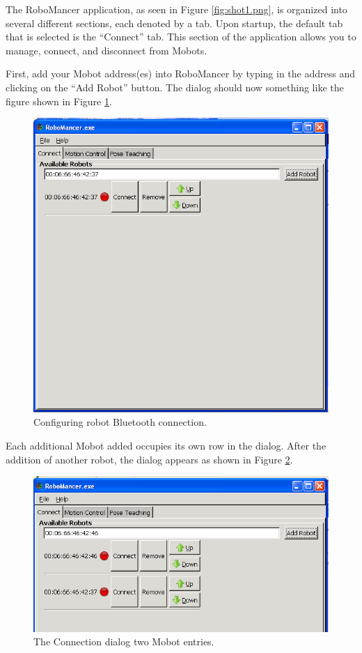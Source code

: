 \documentclass{article}
\begin{document}
The RoboMancer application, as seen in Figure \ref{fig:shot1.png}, is organized into
several different sections, each denoted by a tab. Upon startup, the default tab
that is selected is the ``Connect'' tab. This section of the application allows
you to manage, connect, and disconnect from Mobots. 

First, add your Mobot address(es) into RoboMancer by typing in the address and
clicking on the ``Add Robot'' button. The dialog should now something like
the figure shown in Figure \ref{fig:shot3.png}. 

\begin{figure}[H]
\begin{center}
\includegraphics[width=4.5in]{images/robomancer_screenshot3.png}
\end{center}
\caption{\label{fig:shot3.png} Configuring robot Bluetooth connection.}
\end{figure}

Each additional Mobot added occupies its own row in the dialog. After the addition
of another robot, the dialog appears as shown in Figure \ref{fig:shot4_a.png}.

\begin{figure}[H]
\begin{center}
\includegraphics[width=4.5in]{images/robomancer_screenshot4.png}
\end{center}
\caption{\label{fig:shot4_a.png} The Connection dialog two Mobot entries.}
\end{figure}
\end{document}
